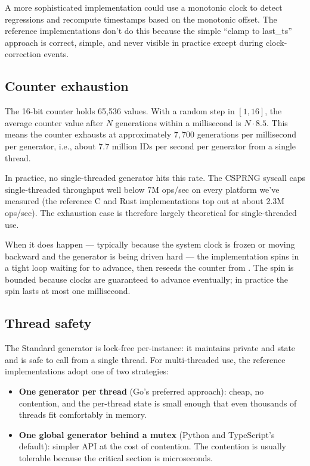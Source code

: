 A more sophisticated implementation could use a monotonic clock to detect regressions and recompute timestamps based on the monotonic offset. The reference implementations don't do this because the simple ``clamp to last\_ts'' approach is correct, simple, and never visible in practice except during clock-correction events.

\subsection{Counter exhaustion}

The 16-bit counter holds 65{,}536 values. With a random step in $[1, 16]$, the average counter value after $N$ generations within a millisecond is $N \cdot 8.5$. This means the counter exhausts at approximately $7{,}700$ generations per millisecond per generator, i.e., about $7.7$ million IDs per second per generator from a single thread.

In practice, no single-threaded generator hits this rate. The CSPRNG syscall caps single-threaded throughput well below 7M ops/sec on every platform we've measured (the reference C and Rust implementations top out at about 2.3M ops/sec). The exhaustion case is therefore largely theoretical for single-threaded use.

When it does happen --- typically because the system clock is frozen or moving backward and the generator is being driven hard --- the implementation spins in a tight loop waiting for  to advance, then reseeds the counter from . The spin is bounded because clocks are guaranteed to advance eventually; in practice the spin lasts at most one millisecond.

\subsection{Thread safety}

The Standard generator is lock-free per-instance: it maintains private  and  state and is safe to call from a single thread. For multi-threaded use, the reference implementations adopt one of two strategies:

\begin{itemize}
  \item \textbf{One generator per thread} (Go's preferred approach): cheap, no contention, and the per-thread state is small enough that even thousands of threads fit comfortably in memory.
  \item \textbf{One global generator behind a mutex} (Python and TypeScript's default): simpler API at the cost of contention. The contention is usually tolerable because the critical section is microseconds.
\end{itemize}

